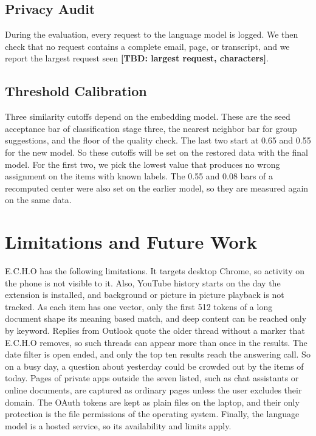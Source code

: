 \documentclass[conference]{IEEEtran}
\newcommand{\tbd}[1]{\textbf{[TBD: #1]}}
\begin{document}
\subsection{Privacy Audit}
During the evaluation, every request to the language model is logged. We then check that no request contains a complete email, page, or transcript, and we report the largest request seen \tbd{largest request, characters}.

\subsection{Threshold Calibration}
Three similarity cutoffs depend on the embedding model. These are the seed acceptance bar of classification stage three, the nearest neighbor bar for group suggestions, and the floor of the quality check. The last two start at 0.65 and 0.55 for the new model. So these cutoffs will be set on the restored data with the final model. For the first two, we pick the lowest value that produces no wrong assignment on the items with known labels. The 0.55 and 0.08 bars of a recomputed center were also set on the earlier model, so they are measured again on the same data.

\section{Limitations and Future Work}\label{sec:limits}
E.C.H.O has the following limitations. It targets desktop Chrome, so activity on the phone is not visible to it. Also, YouTube history starts on the day the extension is installed, and background or picture in picture playback is not tracked. As each item has one vector, only the first 512 tokens of a long document shape its meaning based match, and deep content can be reached only by keyword. Replies from Outlook quote the older thread without a marker that E.C.H.O removes, so such threads can appear more than once in the results. The date filter is open ended, and only the top ten results reach the answering call. So on a busy day, a question about yesterday could be crowded out by the items of today. Pages of private apps outside the seven listed, such as chat assistants or online documents, are captured as ordinary pages unless the user excludes their domain. The OAuth tokens are kept as plain files on the laptop, and their only protection is the file permissions of the operating system. Finally, the language model is a hosted service, so its availability and limits apply.
\end{document}
